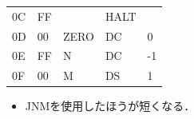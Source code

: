 \documentclass{beamer}                 %
\begin{document}
\begin{frame}
\begin{minipage}{0.5\columnwidth}
{\begin{center}
\begin{tabular}{|l|l|l|l l|}
        0C & FF    &      & HALT &         \\
        0D & 00    & ZERO & DC   & 0       \\
        0E & FF    & N    & DC   & -1      \\
        0F & 00    & M    & DS   & 1       \\
        \hline
      \end{tabular}
    \end{center}}
  \end{minipage}
  \vfill
  \begin{itemize}
  \item JNMを使用したほうが短くなる．
  \end{itemize}
\end{frame}

\end{document}
